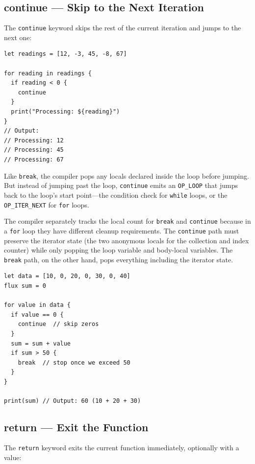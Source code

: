 \subsection{continue --- Skip to the Next Iteration}\label{sec:continue}

The \lstinline|continue| keyword skips the rest of the current iteration and jumps to the next one:

\begin{lstlisting}[language=Lattice, caption={Skipping negative readings}]
let readings = [12, -3, 45, -8, 67]

for reading in readings {
  if reading < 0 {
    continue
  }
  print("Processing: ${reading}")
}
// Output:
// Processing: 12
// Processing: 45
// Processing: 67
\end{lstlisting}

Like \lstinline|break|, the compiler pops any locals declared inside the loop before jumping. But instead of jumping past the loop, \lstinline|continue| emits an \lstinline|OP_LOOP| that jumps back to the loop's start point---the condition check for \lstinline|while| loops, or the \lstinline|OP_ITER_NEXT| for \lstinline|for| loops.

The compiler separately tracks the local count for \lstinline|break| and \lstinline|continue| because in a \lstinline|for| loop they have different cleanup requirements. The \lstinline|continue| path must preserve the iterator state (the two anonymous locals for the collection and index counter) while only popping the loop variable and body-local variables. The \lstinline|break| path, on the other hand, pops everything including the iterator state.

\begin{lstlisting}[language=Lattice, caption={continue and break working together}]
let data = [10, 0, 20, 0, 30, 0, 40]
flux sum = 0

for value in data {
  if value == 0 {
    continue  // skip zeros
  }
  sum = sum + value
  if sum > 50 {
    break  // stop once we exceed 50
  }
}

print(sum) // Output: 60 (10 + 20 + 30)
\end{lstlisting}

\subsection{return --- Exit the Function}\label{sec:return}

The \lstinline|return| keyword exits the current function immediately, optionally with a value:

